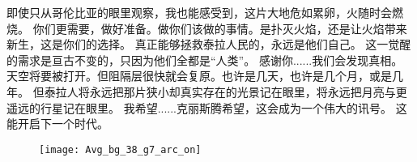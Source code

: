 \documentclass[openany]{book}
\begin{document}
\begin{dialogue}
     即使只从哥伦比亚的眼里观察，我也能感受到，这片大地危如累卵，火随时会燃烧。
     你们更需要，做好准备。做你们该做的事情。是扑灭火焰，还是让火焰带来新生，这是你们的选择。
     真正能够拯救泰拉人民的，永远是他们自己。
     这一觉醒的需求是亘古不变的，只因为他们全都是“人类”。
     感谢你......我们会发现真相。
     天空将要被打开。但阻隔层很快就会复原。也许是几天，也许是几个月，或是几年。
     但泰拉人将永远把那片狭小却真实存在的光景记在眼里，将永远把月亮与更遥远的行星记在眼里。
     我希望......克丽斯腾希望，这会成为一个伟大的讯号。
     这能开启下一个时代。
\end{dialogue}

\begin{figure}[h]
    \centering
    \texttt{[image: Avg\_bg\_38\_g7\_arc\_on]}
\end{figure}
\end{document}
